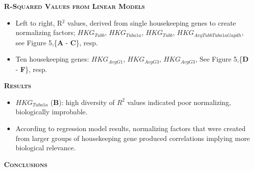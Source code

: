 \documentclass[final,t]{beamer}
\begin{document}
\begin{frame}{}
\begin{columns}
\begin{column}{.5\linewidth}
\begin{block}{\textsc{\textbf{R-Squared Values from Linear Models}}}
\begin{itemize}
				\item Left to right, R$^{2}$ values, derived from single housekeeping genes to create normalizing factors; $HKG_{Tubb}$, $HKG_{Tuba1a}$, $HKG_{Tubb}$, $HKG_{AvgTubbTuba1aGapdh}$, see Figure 5,\{\textbf{A} - \textbf{C}\}, resp.
				\item Ten housekeeping genes: $HKG_{AvgG1}$,  $HKG_{AvgG3}$,  $HKG_{AvgG3}$, See Figure 5,\{\textbf{D} - \textbf{F}\}, resp.
			\end{itemize}
			\vspace*{3mm}
		\end{block}
		\begin{block}{\textsc{\textbf{Results}}}
			\vspace*{3mm}
			
			
			\begin{itemize}
				\item $HKG_{Tuba1a}$ (\textbf{B}): high diversity of $R^{2}$ values indicated poor normalizing, biologically improbable.
				\item According to regression model results, normalizing factors that were created from larger groups of housekeeping gene produced correlations implying more biological relevance.
			\end{itemize}
			\vspace*{3mm}
	\end{block}

%
%
	\begin{block}{\textsc{\textbf{Conclusions}}}
		\vspace*{3mm}


\end{block}
\end{column}
\end{columns}
\end{frame}
\end{document}
